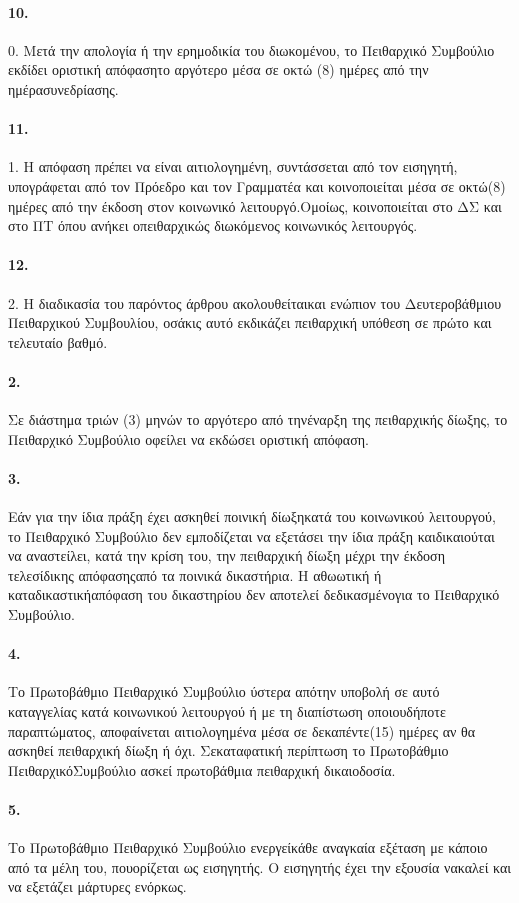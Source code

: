 \documentclass[a4paper,oneside, 10pt]{book}
\begin{document}
\paragraph { 10. } 0. Μετά την απολογία ή την ερημοδικία του διωκομένου, το Πειθαρχικό Συμβούλιο εκδίδει οριστική απόφασητο αργότερο μέσα σε οκτώ (8) ημέρες από την ημέρασυνεδρίασης.
\paragraph { 11. } 1. Η απόφαση πρέπει να είναι αιτιολογημένη, συντάσσεται από τον εισηγητή, υπογράφεται από τον Πρόεδρο και τον Γραμματέα και κοινοποιείται μέσα σε οκτώ(8) ημέρες από την έκδοση στον κοινωνικό λειτουργό.Ομοίως, κοινοποιείται στο ΔΣ και στο ΠΤ όπου ανήκει οπειθαρχικώς διωκόμενος κοινωνικός λειτουργός.
\paragraph { 12. } 2. Η διαδικασία του παρόντος άρθρου ακολουθείταικαι ενώπιον του Δευτεροβάθμιου Πειθαρχικού Συμβουλίου, οσάκις αυτό εκδικάζει πειθαρχική υπόθεση σε πρώτο και τελευταίο βαθμό.
\paragraph { 2. } Σε διάστημα τριών (3) μηνών το αργότερο από τηνέναρξη της πειθαρχικής δίωξης, το Πειθαρχικό Συμβούλιο οφείλει να εκδώσει οριστική απόφαση.
\paragraph { 3. } Εάν για την ίδια πράξη έχει ασκηθεί ποινική δίωξηκατά του κοινωνικού λειτουργού, το Πειθαρχικό Συμβούλιο δεν εμποδίζεται να εξετάσει την ίδια πράξη καιδικαιούται να αναστείλει, κατά την κρίση του, την πειθαρχική δίωξη μέχρι την έκδοση τελεσίδικης απόφασηςαπό τα ποινικά δικαστήρια. Η αθωωτική ή καταδικαστικήαπόφαση του δικαστηρίου δεν αποτελεί δεδικασμένογια το Πειθαρχικό Συμβούλιο.
\paragraph { 4. } Το Πρωτοβάθμιο Πειθαρχικό Συμβούλιο ύστερα απότην υποβολή σε αυτό καταγγελίας κατά κοινωνικού λειτουργού ή με τη διαπίστωση οποιουδήποτε παραπτώματος, αποφαίνεται αιτιολογημένα μέσα σε δεκαπέντε(15) ημέρες αν θα ασκηθεί πειθαρχική δίωξη ή όχι. Σεκαταφατική περίπτωση το Πρωτοβάθμιο ΠειθαρχικόΣυμβούλιο ασκεί πρωτοβάθμια πειθαρχική δικαιοδοσία.
\paragraph { 5. } Το Πρωτοβάθμιο Πειθαρχικό Συμβούλιο ενεργείκάθε αναγκαία εξέταση με κάποιο από τα μέλη του, πουορίζεται ως εισηγητής. Ο εισηγητής έχει την εξουσία νακαλεί και να εξετάζει μάρτυρες ενόρκως.
\end{document}
